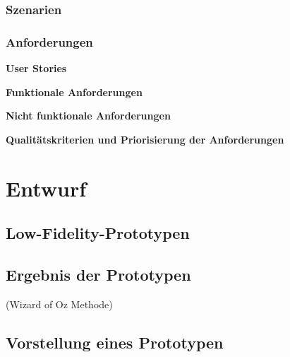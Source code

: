 \subsubsection{Szenarien}

\subsubsection{Anforderungen}

\textbf{User Stories}

\textbf{Funktionale Anforderungen}

\textbf{Nicht funktionale Anforderungen}

\textbf{Qualitätskriterien und Priorisierung der Anforderungen}

\section{Entwurf}

\subsection{Low-Fidelity-Prototypen}

\subsection{Ergebnis der Prototypen}
(Wizard of Oz Methode)

\subsection{Vorstellung eines Prototypen}

